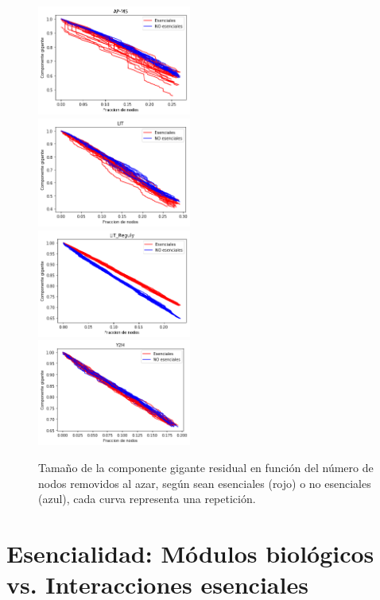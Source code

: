 \documentclass[%
 reprint,
 amsmath,amssymb,
 aps,
]{revtex4-1}
\begin{document}
\begin{figure}
\includegraphics[width=0.45\textwidth]{figura3a.png}\\
\includegraphics[width=0.45\textwidth]{figura3b.png}\\
\includegraphics[width=0.45\textwidth]{figura3c.png}\\
\includegraphics[width=0.45\textwidth]{figura3d.png}\\
\caption{Tama\~no de la componente gigante residual en funci\'on del n\'umero de nodos removidos al azar, seg\'un sean esenciales (rojo) o no esenciales (azul), cada curva representa una repetici\'on.}
\label{figura3}
\end{figure}

\section{Esencialidad: M\'odulos biol\'ogicos vs. Interacciones esenciales}
\end{document}
